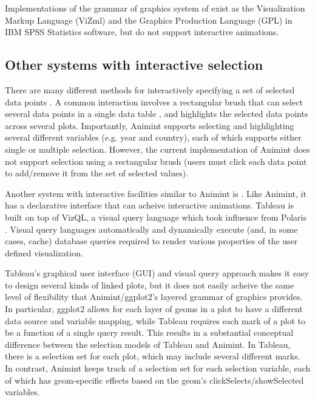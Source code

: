 \documentclass[10pt,journal,compsoc]{IEEEtran}\usepackage[]{graphicx}\usepackage[]{color}
\begin{document}
Implementations of the grammar of graphics system of
\citet{wilkinson} exist as the Visualization Markup Language (ViZml)
and the Graphics Production Language (GPL) in IBM SPSS Statistics
software, but do not support interactive animations.

\subsection{Other systems with interactive selection}

There are many different methods for interactively specifying a set of
selected data points \citep{scented-widgets, heer2008generalized}. A
common interaction involves a rectangular brush that can select
several data points in a single data table \citep{cleveland,
  brushing-scatterplots}, and highlights the selected data points
across several plots. Importantly, Animint supports selecting and
highlighting several different variables (e.g. year and
country), each of which supports either single or multiple
selection. However, the current implementation of Animint does not
support selection using a rectangular brush (users must click each
data point to add/remove it from the set of selected values).

Another system with interactive facilities similar to Animint is
 \citet{tableau}. Like Animint, it has a declarative
interface that can acheive interactive animations.
Tableau is built on top of VizQL, a visual query language
which took influence from Polaris \citep{polaris}.
Visual query languages automatically and dynamically
execute (and, in some cases, cache) database queries
required to render various properties of the user
defined visualization.

Tableau's graphical user interface (GUI) and visual query approach
makes it easy to design several kinds of linked plots, but it does not
easily acheive the same level of flexibility that Animint/ggplot2's
layered grammar of graphics provides. In particular, ggplot2 allows
for each layer of geoms in a plot to have a different data source and
variable mapping, while Tableau requires each mark of a plot to be a
function of a single query result. This results in a substantial
conceptual difference between the selection models of Tableau and
Animint. In Tableau, there is a selection set for each plot, which may
include several different marks. In contrast, Animint keeps track of a
selection set for each selection variable, each of which has
geom-specific effects based on the geom's clickSelects/showSelected
variables.
\end{document}
